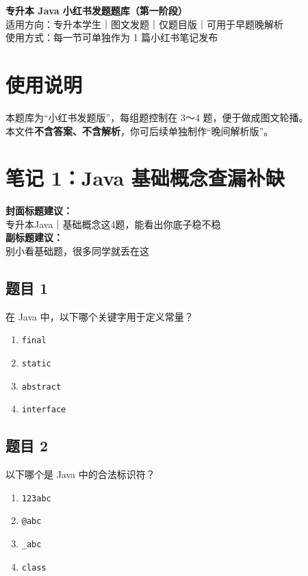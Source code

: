 \documentclass[12pt,a4paper]{ctexart}
\begin{document}
\begin{center}
    {\LARGE \textbf{专升本 Java 小红书发题题库（第一阶段）}}\\[0.6em]
    {\large 适用方向：专升本学生｜图文发题｜仅题目版｜可用于早题晚解析}\\[0.8em]
    {\normalsize 使用方式：每一节可单独作为 1 篇小红书笔记发布}
\end{center}

\vspace{1em}

\section*{使用说明}
本题库为“小红书发题版”，每组题控制在 3～4 题，便于做成图文轮播。\\
本文件\textbf{不含答案、不含解析}，你可后续单独制作“晚间解析版”。

\newpage

\section{笔记 1：Java 基础概念查漏补缺}
\begin{coverbox}
\textbf{封面标题建议：}\\
专升本Java｜基础概念这4题，能看出你底子稳不稳\\
\textbf{副标题建议：}\\
别小看基础题，很多同学就丢在这
\end{coverbox}

\subsection*{题目 1}
在 Java 中，以下哪个关键字用于定义常量？
\begin{enumerate}[label=\Alph*.]
    \item \texttt{final}
    \item \texttt{static}
    \item \texttt{abstract}
    \item \texttt{interface}
\end{enumerate}

\subsection*{题目 2}
以下哪个是 Java 中的合法标识符？
\begin{enumerate}[label=\Alph*.]
    \item \texttt{123abc}
    \item \texttt{@abc}
    \item \texttt{\_abc}
    \item \texttt{class}
\end{enumerate}
\end{document}
